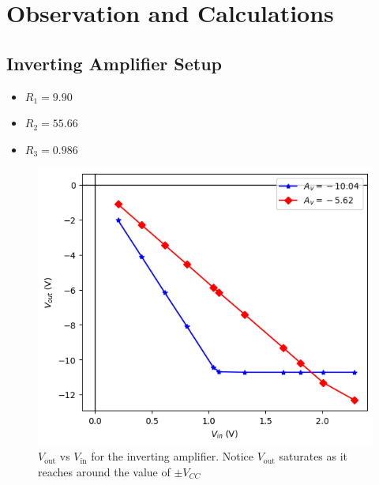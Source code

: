 \section{Observation and Calculations}

\subsection{Inverting Amplifier Setup}
    \begin{itemize}
        \item $R_{1}=9.90$ \kohm
        \item $R_{2}=55.66$ \kohm
        \item $R_{3}=0.986$ \kohm
    \end{itemize}
    
    \begin{figure}[H]
        \centering
        \includegraphics[width=1\columnwidth]{images/ga.png}
        \caption{$V_\text{out}$ vs $V_\text{in}$ for the inverting amplifier. Notice $V_\text{out}$ saturates as it reaches around the value of $\pm V_{CC}$}
        \label{g1}
    \end{figure}
    

